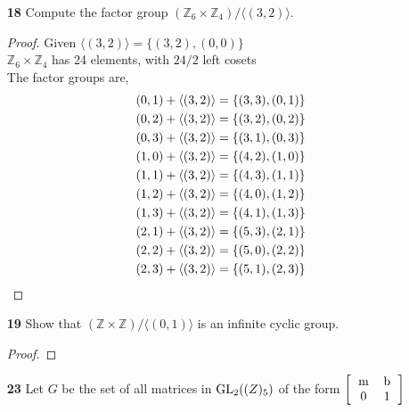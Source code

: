 \documentclass[paper=usletter, fontsize=12pt]{article}
\begin{document}
\begin{itemize}
\begin{enumerate}
\begin{proof}
            \end{proof}

            \item[\textbf{18}] Compute the factor group $(\mathbb{Z}_6 \times
            \mathbb{Z}_4)/ \langle(3,2)\rangle$.
            \begin{proof}

                Given $\langle(3,2)\rangle = \{(3,2),(0,0)\}$\\
                $\mathbb{Z}_6 \times \mathbb{Z}_4$ has 24 elements, with $24/2$
                left cosets\\
                The factor groups are,
                \begin{align*}
                    (0,1) + \langle(3,2)\rangle & = \{(3,3),(0,1)\} \\
                    (0,2) + \langle(3,2)\rangle & = \{(3,2),(0,2)\} \\
                    (0,3) + \langle(3,2)\rangle & = \{(3,1),(0,3)\} \\
                    (1,0) + \langle(3,2)\rangle & = \{(4,2),(1,0)\} \\
                    (1,1) + \langle(3,2)\rangle & = \{(4,3),(1,1)\} \\
                    (1,2) + \langle(3,2)\rangle & = \{(4,0),(1,2)\} \\
                    (1,3) + \langle(3,2)\rangle & = \{(4,1),(1,3)\} \\
                    (2,1) + \langle(3,2)\rangle & = \{(5,3),(2,1)\} \\
                    (2,2) + \langle(3,2)\rangle & = \{(5,0),(2,2)\} \\
                    (2,3) + \langle(3,2)\rangle & = \{(5,1),(2,3)\} \qedhere
                \end{align*}

            \end{proof}

            \item[\textbf{19}] Show that $(\mathbb{Z} \times \mathbb{Z})/
            \langle(0,1)\rangle$ is an infinite cyclic group.
            \begin{proof}
            \end{proof}

            \item[\textbf{23}] Let $G$ be the set of all matrices in $\text{GL}_2(\mathbb(Z)_5)$ of the form $\left[\begin{tabular}{cc}
                            m & b \\
                            0 & 1
                \end{tabular}\right]$
            \begin{enumerate}


\end{enumerate}
\end{enumerate}
\end{itemize}
\end{document}

